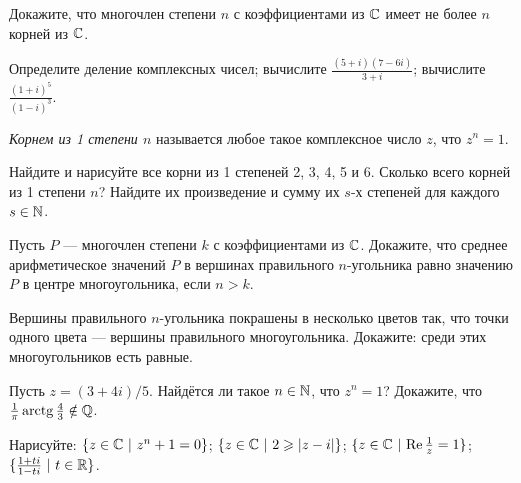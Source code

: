 \documentclass[a4paper,11pt]{article}
\begin{document}
Докажите, что многочлен степени $n$ с %
коэффициентами из $\mathbb{C}$ имеет не более $n$ %
корней из $\mathbb{C}$.




 Определите деление комплексных чисел;
 вычислите $\frac{(5+i)(7-6i)}{3+i}$;
 вычислите $\frac{(1+i)^5}{(1-i)^3}$.



{\em Корнем из 1 степени $n$} называется любое такое комплексное число $z$, что $z^n=1$.

 Найдите и нарисуйте все корни из 1 степеней 2, 3, 4, 5 и 6.
 Сколько всего корней из 1 степени $n$? Найдите их произведение и сумму их $s$-х степеней для каждого $s\in\mathbb{N}$.

 Пусть $P$ --- многочлен степени $k$ с коэффициентами из $\mathbb{C}$.
Докажите, что среднее арифметическое значений $P$ в вершинах
правильного $n$-угольника равно значению $P$ в центре многоугольника,
если $n>k$.

Вершины правильного $n$-угольника покрашены в несколько цветов так, что точки одного цвета --- вершины правильного многоугольника. Докажите: среди этих многоугольников есть равные.

Пусть $z= (3+4i)/5$. Найд\"ется ли такое $n\in\mathbb{N}$, что $z^n=1$?
Докажите, что $\frac1\pi\arctg\frac43\notin\Q$. %



Нарисуйте: %
\!\!\!\!  \!\!\!\! $\{ z\in\mathbb{C}\,\,|\,\,z^n+1=0\}$;
\!\!\!\!   \!\!\!\! $\{z\in\mathbb{C}\,\,|\,\,2\geqslant|z-i|\}$;
\!\!\!\!   \!\!\!\! $\{z\in\mathbb{C}\,\,|\,\,{\rm Re}\,\frac{1}{z}=1\}$;
\!\!\!\!  \!\!\!\!  $\{\frac{1+ti}{1-ti}\,\,|\,\,t\in\mathbb{R}\}$.









\end{document}
